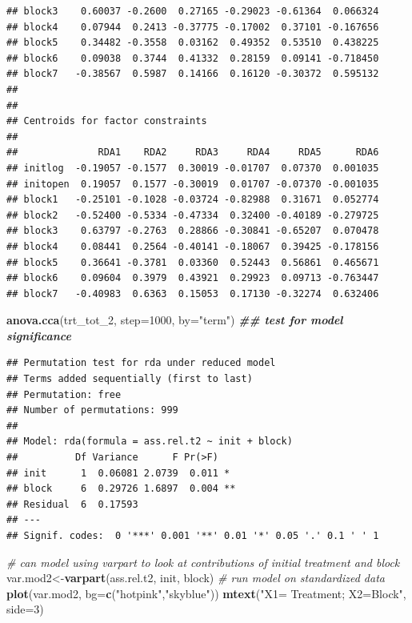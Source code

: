 \documentclass[
]{article}
\newenvironment{Shaded}{\begin{snugshade}}{\end{snugshade}}
\newcommand{\AttributeTok}[1]{\textcolor[rgb]{0.13,0.29,0.53}{#1}}
\newcommand{\CommentTok}[1]{\textcolor[rgb]{0.56,0.35,0.01}{\textit{#1}}}
\newcommand{\DecValTok}[1]{\textcolor[rgb]{0.00,0.00,0.81}{#1}}
\newcommand{\DocumentationTok}[1]{\textcolor[rgb]{0.56,0.35,0.01}{\textbf{\textit{#1}}}}
\newcommand{\FunctionTok}[1]{\textcolor[rgb]{0.13,0.29,0.53}{\textbf{#1}}}
\newcommand{\NormalTok}[1]{#1}
\newcommand{\OtherTok}[1]{\textcolor[rgb]{0.56,0.35,0.01}{#1}}
\newcommand{\StringTok}[1]{\textcolor[rgb]{0.31,0.60,0.02}{#1}}
\begin{document}
\begin{verbatim}
## block3    0.60037 -0.2600  0.27165 -0.29023 -0.61364  0.066324
## block4    0.07944  0.2413 -0.37775 -0.17002  0.37101 -0.167656
## block5    0.34482 -0.3558  0.03162  0.49352  0.53510  0.438225
## block6    0.09038  0.3744  0.41332  0.28159  0.09141 -0.718450
## block7   -0.38567  0.5987  0.14166  0.16120 -0.30372  0.595132
## 
## 
## Centroids for factor constraints
## 
##              RDA1    RDA2     RDA3     RDA4     RDA5      RDA6
## initlog  -0.19057 -0.1577  0.30019 -0.01707  0.07370  0.001035
## initopen  0.19057  0.1577 -0.30019  0.01707 -0.07370 -0.001035
## block1   -0.25101 -0.1028 -0.03724 -0.82988  0.31671  0.052774
## block2   -0.52400 -0.5334 -0.47334  0.32400 -0.40189 -0.279725
## block3    0.63797 -0.2763  0.28866 -0.30841 -0.65207  0.070478
## block4    0.08441  0.2564 -0.40141 -0.18067  0.39425 -0.178156
## block5    0.36641 -0.3781  0.03360  0.52443  0.56861  0.465671
## block6    0.09604  0.3979  0.43921  0.29923  0.09713 -0.763447
## block7   -0.40983  0.6363  0.15053  0.17130 -0.32274  0.632406
\end{verbatim}

\begin{Shaded}
\begin{Highlighting}[]
\FunctionTok{anova.cca}\NormalTok{(trt\_tot\_2, }\AttributeTok{step=}\DecValTok{1000}\NormalTok{, }\AttributeTok{by=}\StringTok{"term"}\NormalTok{) }\DocumentationTok{\#\# test for model significance}
\end{Highlighting}
\end{Shaded}

\begin{verbatim}
## Permutation test for rda under reduced model
## Terms added sequentially (first to last)
## Permutation: free
## Number of permutations: 999
## 
## Model: rda(formula = ass.rel.t2 ~ init + block)
##          Df Variance      F Pr(>F)   
## init      1  0.06081 2.0739  0.011 * 
## block     6  0.29726 1.6897  0.004 **
## Residual  6  0.17593                 
## ---
## Signif. codes:  0 '***' 0.001 '**' 0.01 '*' 0.05 '.' 0.1 ' ' 1
\end{verbatim}

\begin{Shaded}
\begin{Highlighting}[]
\CommentTok{\# can model using varpart to look at contributions of initial treatment and block}
\NormalTok{var.mod2}\OtherTok{\textless{}{-}}\FunctionTok{varpart}\NormalTok{(ass.rel.t2, init, block) }\CommentTok{\# run model on standardized data}
\FunctionTok{plot}\NormalTok{(var.mod2, }\AttributeTok{bg=}\FunctionTok{c}\NormalTok{(}\StringTok{"hotpink"}\NormalTok{,}\StringTok{"skyblue"}\NormalTok{))}
\FunctionTok{mtext}\NormalTok{(}\StringTok{"X1= Treatment; X2=Block"}\NormalTok{, }\AttributeTok{side=}\DecValTok{3}\NormalTok{)}
\end{Highlighting}
\end{Shaded}
\end{document}
